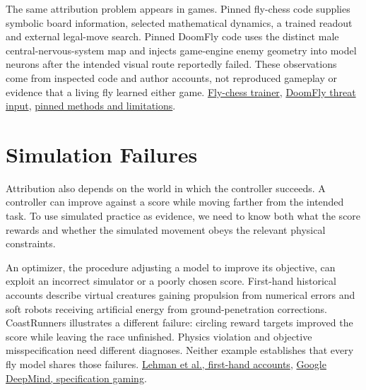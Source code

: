 The same attribution problem appears in games. Pinned fly-chess code supplies symbolic board information, selected mathematical dynamics, a trained readout and external legal-move search. Pinned DoomFly code uses the distinct male central-nervous-system map and injects game-engine enemy geometry into model neurons after the intended visual route reportedly failed. These observations come from inspected code and author accounts, not reproduced gameplay or evidence that a living fly learned either game. \href{https://github.com/mncrftfrcnm/making-fly-play-chess/blob/b97dfefbf9b8850f3cdf6b412c2ed840be94e260/scripts/fly_chess_trainer.py}{Fly-chess trainer}, \href{https://github.com/shreyash-sharma/doomFly/blob/5f6c2881be5f5f40b0592a75e6ee231b50333b40/src/doom/fearless/danger.py}{DoomFly threat input}, \href{https://github.com/shreyash-sharma/doomFly/blob/5f6c2881be5f5f40b0592a75e6ee231b50333b40/docs/how-it-works.md}{pinned methods and limitations}.\par

\section{Simulation Failures}

Attribution also depends on the world in which the controller succeeds. A
controller can improve against a score while moving farther from the intended
task. To use simulated practice as evidence, we need to know both what the
score rewards and whether the simulated movement obeys the relevant
physical constraints.\par

An optimizer, the procedure adjusting a model to improve its objective, can exploit an incorrect simulator or a poorly chosen score. First-hand historical accounts describe virtual creatures gaining propulsion from numerical errors and soft robots receiving artificial energy from ground-penetration corrections. CoastRunners illustrates a different failure: circling reward targets improved the score while leaving the race unfinished. Physics violation and objective misspecification need different diagnoses. Neither example establishes that every fly model shares those failures. \href{https://arxiv.org/html/1803.03453v4}{Lehman et al., first-hand accounts}, \href{https://deepmind.google/blog/specification-gaming-the-flip-side-of-ai-ingenuity/}{Google DeepMind, specification gaming}.\par

